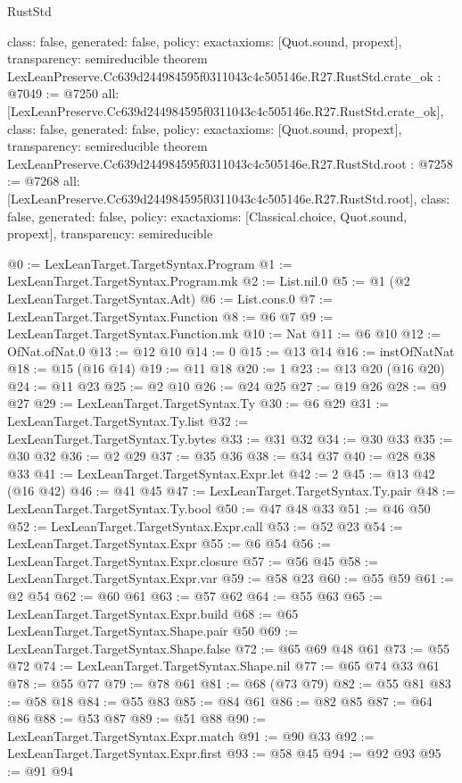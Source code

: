 \begin{lexlean}{RustStd}
\begin{coremodule}
{  class: false,
  generated: false,
  policy: exact{axioms: [Quot.sound, propext]},
  transparency: semireducible
}
theorem LexLeanPreserve.Cc639d244984595f0311043c4c505146e.R27.RustStd.crate_ok : @7049 := @7250 {
  all: [LexLeanPreserve.Cc639d244984595f0311043c4c505146e.R27.RustStd.crate_ok],
  class: false,
  generated: false,
  policy: exact{axioms: [Quot.sound, propext]},
  transparency: semireducible
}
theorem LexLeanPreserve.Cc639d244984595f0311043c4c505146e.R27.RustStd.root : @7258 := @7268 {
  all: [LexLeanPreserve.Cc639d244984595f0311043c4c505146e.R27.RustStd.root],
  class: false,
  generated: false,
  policy: exact{axioms: [Classical.choice, Quot.sound, propext]},
  transparency: semireducible
}

@0 := LexLeanTarget.TargetSyntax.Program
@1 := LexLeanTarget.TargetSyntax.Program.mk
@2 := List.nil.{0}
@5 := @1 (@2 LexLeanTarget.TargetSyntax.Adt)
@6 := List.cons.{0}
@7 := LexLeanTarget.TargetSyntax.Function
@8 := @6 @7
@9 := LexLeanTarget.TargetSyntax.Function.mk
@10 := Nat
@11 := @6 @10
@12 := OfNat.ofNat.{0}
@13 := @12 @10
@14 := 0
@15 := @13 @14
@16 := instOfNatNat
@18 := @15 (@16 @14)
@19 := @11 @18
@20 := 1
@23 := @13 @20 (@16 @20)
@24 := @11 @23
@25 := @2 @10
@26 := @24 @25
@27 := @19 @26
@28 := @9 @27
@29 := LexLeanTarget.TargetSyntax.Ty
@30 := @6 @29
@31 := LexLeanTarget.TargetSyntax.Ty.list
@32 := LexLeanTarget.TargetSyntax.Ty.bytes
@33 := @31 @32
@34 := @30 @33
@35 := @30 @32
@36 := @2 @29
@37 := @35 @36
@38 := @34 @37
@40 := @28 @38 @33
@41 := LexLeanTarget.TargetSyntax.Expr.let
@42 := 2
@45 := @13 @42 (@16 @42)
@46 := @41 @45
@47 := LexLeanTarget.TargetSyntax.Ty.pair
@48 := LexLeanTarget.TargetSyntax.Ty.bool
@50 := @47 @48 @33
@51 := @46 @50
@52 := LexLeanTarget.TargetSyntax.Expr.call
@53 := @52 @23
@54 := LexLeanTarget.TargetSyntax.Expr
@55 := @6 @54
@56 := LexLeanTarget.TargetSyntax.Expr.closure
@57 := @56 @45
@58 := LexLeanTarget.TargetSyntax.Expr.var
@59 := @58 @23
@60 := @55 @59
@61 := @2 @54
@62 := @60 @61
@63 := @57 @62
@64 := @55 @63
@65 := LexLeanTarget.TargetSyntax.Expr.build
@68 := @65 LexLeanTarget.TargetSyntax.Shape.pair @50
@69 := LexLeanTarget.TargetSyntax.Shape.false
@72 := @65 @69 @48 @61
@73 := @55 @72
@74 := LexLeanTarget.TargetSyntax.Shape.nil
@77 := @65 @74 @33 @61
@78 := @55 @77
@79 := @78 @61
@81 := @68 (@73 @79)
@82 := @55 @81
@83 := @58 @18
@84 := @55 @83
@85 := @84 @61
@86 := @82 @85
@87 := @64 @86
@88 := @53 @87
@89 := @51 @88
@90 := LexLeanTarget.TargetSyntax.Expr.match
@91 := @90 @33
@92 := LexLeanTarget.TargetSyntax.Expr.first
@93 := @58 @45
@94 := @92 @93
@95 := @91 @94

\end{coremodule}
\end{lexlean}
